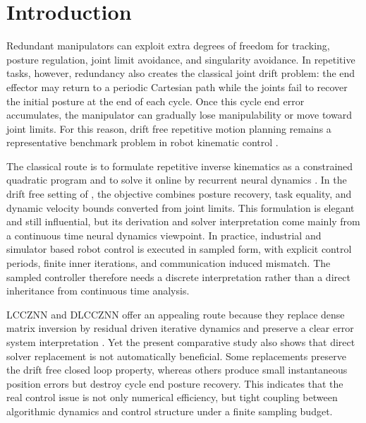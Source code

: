 \section{Introduction}

Redundant manipulators can exploit extra degrees of freedom for tracking, posture regulation, joint limit avoidance, and singularity avoidance. In repetitive tasks, however, redundancy also creates the classical joint drift problem: the end effector may return to a periodic Cartesian path while the joints fail to recover the initial posture at the end of each cycle. Once this cycle end error accumulates, the manipulator can gradually lose manipulability or move toward joint limits. For this reason, drift free repetitive motion planning remains a representative benchmark problem in robot kinematic control \citep{zhang2009rmp,zhang2017three}.

The classical route is to formulate repetitive inverse kinematics as a constrained quadratic program and to solve it online by recurrent neural dynamics \citep{wang2004recurrent,toshani2014ik,tan2022physical,hassan2020review}. In the drift free setting of \citet{zhang2009rmp}, the objective combines posture recovery, task equality, and dynamic velocity bounds converted from joint limits. This formulation is elegant and still influential, but its derivation and solver interpretation come mainly from a continuous time neural dynamics viewpoint. In practice, industrial and simulator based robot control is executed in sampled form, with explicit control periods, finite inner iterations, and communication induced mismatch. The sampled controller therefore needs a discrete interpretation rather than a direct inheritance from continuous time analysis.

LCCZNN and DLCCZNN offer an appealing route because they replace dense matrix inversion by residual driven iterative dynamics and preserve a clear error system interpretation \citep{zheng2024lccznn,qiu2022jerk,yang2025predefined,wen2024firstsecond,li2026dlccznn}. Yet the present comparative study also shows that direct solver replacement is not automatically beneficial. Some replacements preserve the drift free closed loop property, whereas others produce small instantaneous position errors but destroy cycle end posture recovery. This indicates that the real control issue is not only numerical efficiency, but tight coupling between algorithmic dynamics and control structure under a finite sampling budget.


